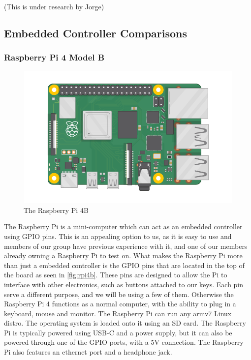 (This is under research by Jorge)


\subsection{Embedded Controller Comparisons}
\label{sec:embedded_controllers}

\subsubsection{Raspberry Pi 4 Model B}

\begin{figure}[h!]
  \centering
  \includegraphics[width=\linewidth]{image/raspberry-pi.png}
  \caption{The Raspberry Pi 4B \autocite{raspberry-pi-4b}}
  \label{fig:rpi4b}
\end{figure}

The Raspberry Pi is a mini-computer which can act as an embedded controller using GPIO
pins. This is an appealing option to us, as it is easy to use and members of our group
have previous experience with it, and one of our members already owning a Raspberry Pi to
test on. What makes the Raspberry Pi more than just a embedded controller is the GPIO pins
that are located in the top of the board as seen in \autoref{fig:rpi4b}. These pins are
designed to allow the Pi to interface with other electronics, such as buttons attached to
our keys. Each pin serve a different purpose, and we will be using a few of them.
Otherwise the Raspberry Pi 4 functions as a normal computer, with the ability to plug in a
keyboard, mouse and monitor. The Raspberry Pi can run any armv7 Linux distro. The
operating system is loaded onto it using an SD card. The Raspberry Pi is typically powered
using USB-C and a power supply, but it can also be powered through one of the GPIO ports,
with a 5V connection. The Raspberry Pi also features an ethernet port and a headphone
jack.

